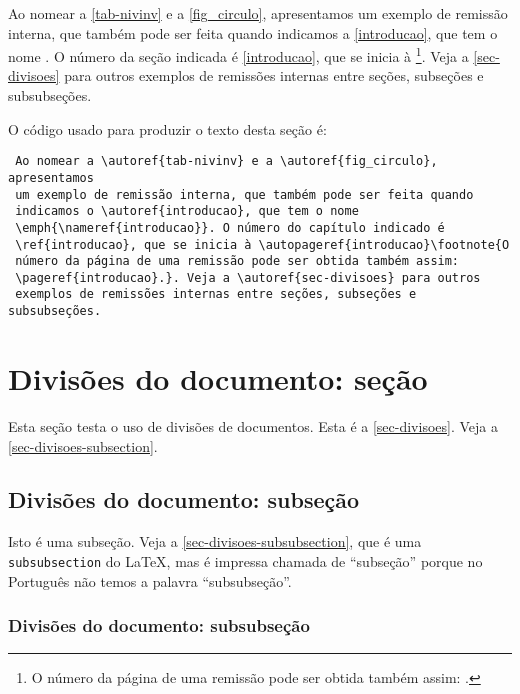 \documentclass[article,12pt,oneside,a4paper,chapter=TITLE,
			   english,brazil]{abntex2}
\begin{document}
\begin{anexosenv}
Ao nomear a \autoref{tab-nivinv} e a \autoref{fig_circulo}, apresentamos um exemplo de remissão interna, que também pode ser feita quando indicamos a \autoref{introducao}, que tem o nome \emph{}. O número da seção indicada é \ref{introducao}, que se inicia à \footnote{O número da página de uma remissão pode ser obtida também assim: \pageref{introducao}.}. Veja a \autoref{sec-divisoes} para outros exemplos de remissões internas entre seções, subseções e subsubseções.

O código usado para produzir o texto desta seção é:
\begin{verbatim}
 Ao nomear a \autoref{tab-nivinv} e a \autoref{fig_circulo}, apresentamos
 um exemplo de remissão interna, que também pode ser feita quando 
 indicamos o \autoref{introducao}, que tem o nome 
 \emph{\nameref{introducao}}. O número do capítulo indicado é 
 \ref{introducao}, que se inicia à \autopageref{introducao}\footnote{O 
 número da página de uma remissão pode ser obtida também assim:
 \pageref{introducao}.}. Veja a \autoref{sec-divisoes} para outros 
 exemplos de remissões internas entre seções, subseções e subsubseções.
\end{verbatim}


\section{Divisões do documento: seção}\label{sec-divisoes}

Esta seção testa o uso de divisões de documentos. Esta é a \autoref{sec-divisoes}. Veja a \autoref{sec-divisoes-subsection}.

\subsection{Divisões do documento: subseção}\label{sec-divisoes-subsection}

Isto é uma subseção. Veja a \autoref{sec-divisoes-subsubsection}, que é uma \texttt{subsubsection} do \LaTeX, mas é impressa chamada de ``subseção'' porque no Português não temos a palavra ``subsubseção''.

\subsubsection{Divisões do documento: subsubseção}
\label{sec-divisoes-subsubsection}


\end{anexosenv}
\end{document}
